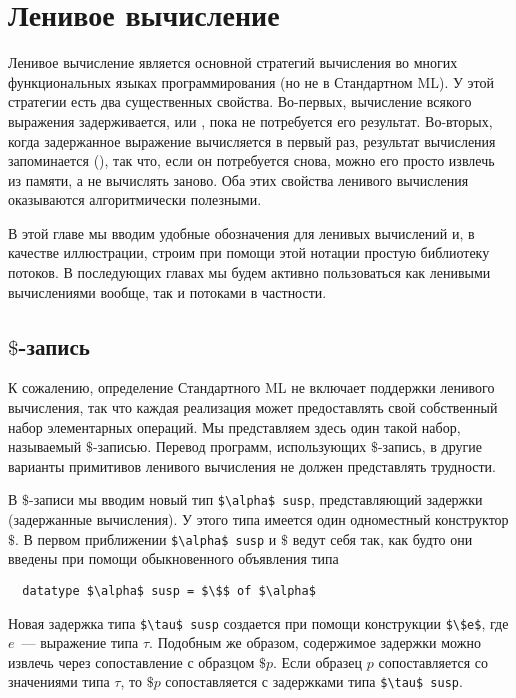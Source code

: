 \chapter{Ленивое вычисление}
\label{ch:4}

Ленивое вычисление является основной стратегий вычисления во многих
функциональных языках программирования (но не в Стандартном ML). У
этой стратегии есть два существенных свойства. Во-первых, вычисление
всякого выражения задерживается, или ,
пока не потребуется его результат. Во-вторых, когда задержанное
выражение вычисляется в первый раз, результат вычисления запоминается
(), так что, если он потребуется снова,
можно его просто извлечь из памяти, а не вычислять заново. Оба этих свойства
ленивого вычисления оказываются алгоритмически полезными.

В этой главе мы вводим удобные обозначения для ленивых вычислений и, в
качестве иллюстрации, строим при помощи этой нотации простую
библиотеку потоков. В последующих главах мы будем активно пользоваться
как ленивыми вычислениями вообще, так и потоками в частности.

\section{$\$$-запись}
\label{sc:4.1}

К сожалению, определение Стандартного ML \cite{Milner-etal1997} не
включает поддержки ленивого вычисления, так что каждая реализация
может предоставлять свой собственный набор элементарных операций.
Мы представляем здесь один такой набор,
называемый $\$$-записью.  Перевод программ, использующих
$\$$-запись, в другие варианты примитивов ленивого вычисления не
должен представлять трудности.

В $\$$-записи мы вводим новый тип \lstinline!$\alpha$ susp!,
представляющий задержки (задержанные вычисления). У этого типа имеется один
одноместный конструктор $\$$. В первом приближении 
\lstinline!$\alpha$ susp! и $\$$ ведут себя так, как будто они введены при помощи
обыкновенного объявления типа
\begin{lstlisting}
  datatype $\alpha$ susp = $\$$ of $\alpha$
\end{lstlisting}
Новая задержка типа \lstinline!$\tau$ susp! создается
при помощи конструкции \lstinline!$\$e$!, где $e$~---
выражение типа $\tau$. Подобным же образом, содержимое задержки можно
извлечь через сопоставление с образцом
$\$p$. Если образец $p$ сопоставляется со значениями типа $\tau$, то
$\$p$ сопоставляется с задержками типа
\lstinline!$\tau$ susp!.

